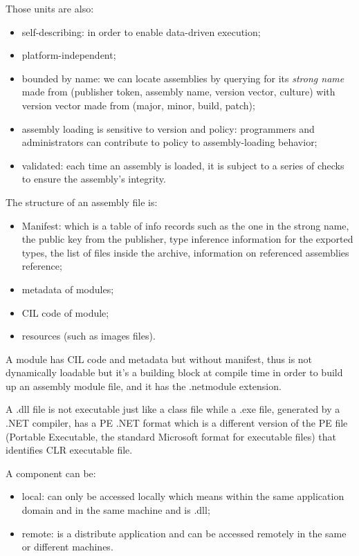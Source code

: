 Those units are also:
\begin{itemize}
    \item self-describing: in order to enable data-driven execution;
    \item platform-independent;
    \item bounded by name: we can locate assemblies by querying for its \emph{strong name} made from (publisher token, assembly name, version vector, culture) with version vector made from (major, minor, build, patch);
    \item assembly loading is sensitive to version and policy: programmers and administrators can contribute to policy to assembly-loading behavior;
    \item validated: each time an assembly is loaded, it is subject to a series of checks to ensure the assembly's integrity.
\end{itemize}

The structure of an assembly file is:
\begin{itemize}
    \item Manifest: which is a table of info records such as the one in the strong name, the public key from the publisher, type inference information for the exported types, the list of files inside the archive, information on referenced assemblies reference;
    \item metadata of modules;
    \item CIL code of module;
    \item resources (such as images files).
\end{itemize}

A module has CIL code and metadata but without manifest, thus is not dynamically loadable but it's a building block at compile time in order to build up an assembly module file, and it has the .netmodule extension.

A .dll file is not executable just like a class file while a .exe file, generated by a .NET compiler, has a PE .NET format which is a different version of the PE file (Portable Executable, the standard Microsoft format for executable files) that identifies CLR executable file.

A component can be:
\begin{itemize}
    \item local: can only be accessed locally which means within the same application domain and in the same machine and is .dll;
    \item remote: is a distribute application and can be accessed remotely in the same or different machines. 
\end{itemize}

